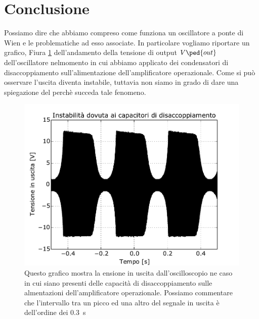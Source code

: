 \section*{Conclusione}

Possiamo dire che abbiamo compreso come funziona un oscillatore a ponte di Wien e le problematiche ad esso associate. In particolare vogliamo riportare un grafico, Fiura \ref{fig:instabilita} dell'andamento della tensione di output $V\ped{out}$  dell'oscillatore nelmomento in cui abbiamo applicato dei condensatori di disaccoppiamento sull’alimentazione dell’amplificatore operazionale.
Come si può osservare l'uscita diventa instabile, tuttavia non siamo in grado di dare una spiegazione del perchè succeda tale fenomeno. 

\begin{figure}[h]
    \centering
    \includegraphics[width=0.7\columnwidth]{figure/inststab.pdf}
    \caption{Questo grafico mostra la ensione in uscita dall'oscilloscopio ne caso in cui siano presenti delle capacità di disaccoppiamento sulle almentazioni dell'amplificatore operazionale. Possiamo commentare che l'intervallo tra un picco ed una altro del segnale in uscita è dell'ordine dei \SI{0.3}{\second}}
    \label{fig:instabilita}
\end{figure}